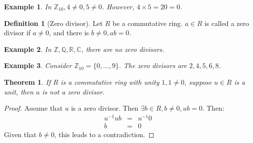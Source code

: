 \documentclass{article}
\theoremstyle{MyNonumberplain}
\theoremstyle{break}
\newtheorem*{proof}{Proof. }
\theoremstyle{break}
\newtheorem{theorem}{Theorem}[section]
\newtheorem{example}{Example}[section]
\theoremstyle{break}
\theoremstyle{definition}
\theoremstyle{break}
\newtheorem{definition}{Definition}[section]
\begin{document}
\begin{expbox}
    \begin{example}
        In $\mathbb{Z}_{10}, 4 \neq 0, 5 \neq 0$. However, $4 \times 5 = 20 = 0$.
      \end{example}
\end{expbox}

\begin{defbox}
    \begin{definition}[Zero divisor]
        Let $R$ be a commutative ring. $a \in R$ is called a zero divisor if $a \neq
        0$, and there is $b \neq 0, a b = 0$.
    \end{definition}
\end{defbox}

\begin{expbox}
    \begin{example}
        In $\mathbb{Z}, \mathbb{Q}, \mathbb{R}, \mathbb{C}$, there are no zero
        divisors.
    \end{example}
\end{expbox}

\begin{expbox}
    \begin{example}
        Consider $\mathbb{Z}_{10} = \{ 0, \ldots, 9 \}$. The zero divisors are $2, 4,
        5, 6, 8$. 
    \end{example}
\end{expbox}

\begin{thmbox}
    \begin{theorem}
        If $R$ is a commutative ring with unity $1, 1 \neq 0$, suppose $u \in R$ is a
        unit, then $u$ is not a zero divisor. 
    \end{theorem}
    \begin{prfbox}
        \begin{proof}
            Assume that $u$ is a zero divisor. Then $\exists b \in R, b \neq 0, u b = 0$.
            Then:
            \begin{eqnarray*}
              u^{- 1} u b & = & u^{- 1} 0\\
              b & = & 0
            \end{eqnarray*}
            Given that $b \neq 0$, this leads to a contradiction.
        \end{proof}
    \end{prfbox}
\end{thmbox}
\end{document}
